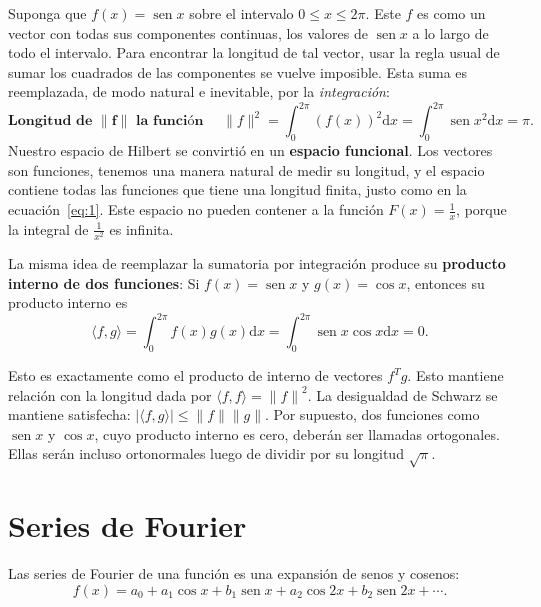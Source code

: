 \documentclass[
	a4paper,
	11pt,
	oneside
]{scrreprt}
\begin{document}
Suponga que $f(x)=\operatorname{sen}x$ sobre el intervalo $0\le x\le 2\pi$. Este $f$ es como un vector con todas sus componentes continuas, los valores de $\operatorname{sen}x$ a lo largo de todo el intervalo. Para encontrar la longitud de tal vector, usar la regla usual de sumar los cuadrados de las componentes se vuelve imposible. Esta suma es reemplazada, de modo natural e inevitable, por la \emph{integración}:
\begin{equation}\label{eq:3}
\textbf{Longitud de }\|\bm{f}\|\textbf{ la función }\quad\|f\|^2=\int_{0}^{2\pi}{\left(f(x)\right)}^2\mathrm{d}x=\int_{0}^{2\pi}{\operatorname{sen}x}^{2}\mathrm{d}x=\pi.
\end{equation}
Nuestro espacio de Hilbert se convirtió en un \textbf{espacio funcional}. Los vectores son funciones, tenemos una manera natural de medir su longitud, y el espacio contiene todas las funciones que tiene una longitud finita, justo como en la ecuación~\eqref{eq:1}. Este espacio no pueden contener a la función $F(x)=\frac{1}{x}$, porque la integral de $\frac{1}{x^{2}}$ es infinita.

La misma idea de reemplazar la sumatoria por integración produce su \textbf{producto interno de dos funciones}: Si $f(x)=\operatorname{sen}x$ y $g(x)=\cos x$, entonces su producto interno es
\begin{equation}\label{eq:4}
\langle f,g\rangle=\int_{0}^{2\pi}f\left(x\right)g\left(x\right)\mathrm{d}x=\int_{0}^{2\pi}\operatorname{sen}x\cos x\mathrm{d}x=0.
\end{equation}

Esto es exactamente como el producto de interno de vectores $f^{T}g$. Esto mantiene relación con la longitud dada por $\langle f,f\rangle={\|f\|}^2$. La desigualdad de Schwarz se mantiene satisfecha: $\left|\langle f,g \rangle\right|\le\|f\|\|g\|$. Por supuesto, dos funciones como $\operatorname{sen}x$ y $\cos x$, cuyo producto interno es cero, deberán ser llamadas ortogonales. Ellas serán incluso ortonormales luego de dividir por su longitud $\sqrt{\pi}$.

\section{Series de Fourier}
Las series de Fourier de una función es una expansión de senos y cosenos:
\begin{equation}
f\left(x\right)=a_{0}+a_{1}\cos x+b_{1}\operatorname{sen}x+a_{2}\cos 2x+b_{2}\operatorname{sen}2x+\cdots.
\end{equation}
\end{document}
